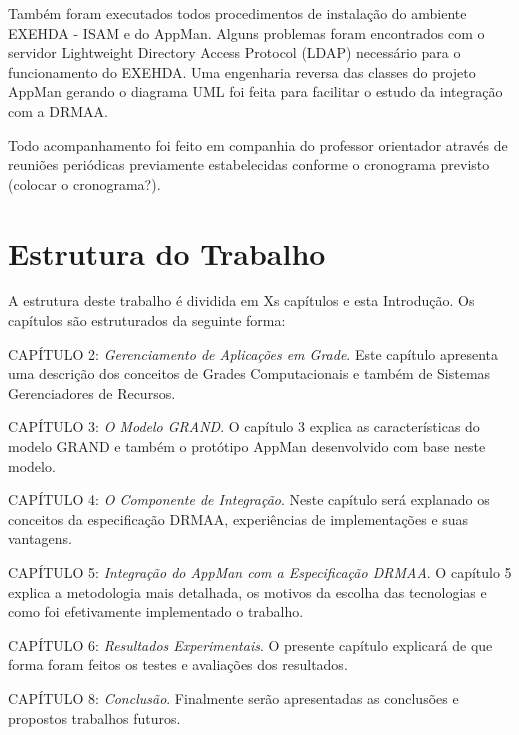 Também foram executados todos procedimentos de instalação do ambiente EXEHDA - ISAM e do AppMan. Alguns problemas foram encontrados com o servidor Lightweight Directory Access Protocol (LDAP) necessário para o funcionamento do EXEHDA. Uma engenharia reversa das classes do projeto AppMan gerando o diagrama UML foi feita para facilitar o estudo da integração com a DRMAA.

Todo acompanhamento foi feito em companhia do professor orientador através de reuniões periódicas previamente estabelecidas conforme o cronograma previsto (colocar o cronograma?).

\section{Estrutura do Trabalho}
A estrutura deste trabalho é dividida em Xs capítulos e esta Introdução. Os capítulos são estruturados da seguinte forma:

CAPÍTULO 2: \emph{Gerenciamento de Aplicações em Grade}. Este capítulo apresenta uma descrição dos conceitos de Grades Computacionais e também de Sistemas Gerenciadores de Recursos.

CAPÍTULO 3: \emph{O Modelo GRAND}. O capítulo 3 explica as características do modelo GRAND e também o protótipo AppMan desenvolvido com base neste modelo.

CAPÍTULO 4: \emph{O Componente de Integração}. Neste capítulo será explanado os conceitos da especificação DRMAA, experiências de implementações e suas vantagens.

CAPÍTULO 5: \emph{Integração do AppMan com a Especificação DRMAA}. O capítulo 5 explica a metodologia mais detalhada, os motivos da escolha das tecnologias e como foi efetivamente implementado o trabalho.

CAPÍTULO 6: \emph{Resultados Experimentais}. O presente capítulo explicará de que forma foram feitos os testes e avaliações dos resultados.

CAPÍTULO 8: \emph{Conclusão}. Finalmente serão apresentadas as conclusões e propostos trabalhos futuros.